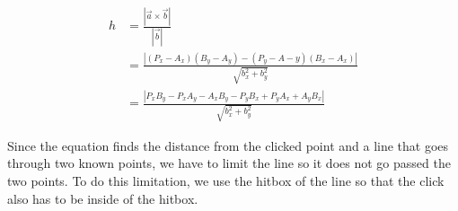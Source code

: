 \begin{equation}\label{eq:final-line-formula}
\begin{aligned}
	h &= \frac{|\vec{a} \times \vec{b}|}{|\vec{b}|}\\
	  &= \frac{|(P_x-A_x)(B_y-A_y)-(P_y-A-y)(B_x-A_x)|}{\sqrt{b_x^2+b_y^2}}\\
	  &= \frac{|P_xB_y-P_xA_y-A_xB_y-P_yB_x+P_yA_x+A_yB_x|}{\sqrt{b_x^2+b_y^2}}
\end{aligned}
\end{equation}

Since the equation finds the distance from the clicked point and a line that goes through two known points, we have to limit the line so it does not go passed the two points.
To do this limitation, we use the hitbox of the line so that the click also has to be inside of the hitbox.








